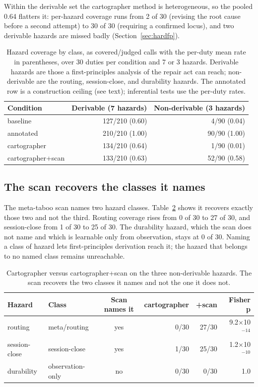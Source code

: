 \documentclass[11pt,a4paper]{article}
\begin{document}
Within the derivable set the cartographer method is heterogeneous, so the pooled
0.64 flatters it: per-hazard coverage runs from 2 of 30 (revising the root cause
before a second attempt) to 30 of 30 (requiring a confirmed locus), and two
derivable hazards are missed badly (Section~\ref{sec:hardfp}).

\begin{table}[h]
\centering
\small
\begin{tabular}{l r r}
\toprule
\textbf{Condition} & \textbf{Derivable (7 hazards)} & \textbf{Non-derivable (3 hazards)} \\
\midrule
baseline & 127/210 \enspace (0.60) & 4/90 \enspace (0.04) \\
annotated & 210/210 \enspace (1.00) & 90/90 \enspace (1.00) \\
cartographer & 134/210 \enspace (0.64) & 1/90 \enspace (0.01) \\
cartographer+scan & 133/210 \enspace (0.63) & 52/90 \enspace (0.58) \\
\bottomrule
\end{tabular}
\caption{Hazard coverage by class, as covered/judged calls with the per-duty mean
rate in parentheses, over 30 duties per condition and 7 or 3 hazards. Derivable
hazards are those a first-principles analysis of the repair act can reach;
non-derivable are the routing, session-close, and durability hazards. The
annotated row is a construction ceiling (see text); inferential tests use the
per-duty rates.}
\label{tab:coverage}
\end{table}

\subsection{The scan recovers the classes it names}

The meta-taboo scan names two hazard classes. Table~\ref{tab:scan} shows it
recovers exactly those two and not the third. Routing coverage rises from 0 of
30 to 27 of 30, and session-close from 1 of 30 to 25 of 30. The durability
hazard, which the scan does not name and which is learnable only from
observation, stays at 0 of 30. Naming a class of hazard lets first-principles
derivation reach it; the hazard that belongs to no named class remains
unreachable.

\begin{table}[h]
\centering
\small
\begin{tabular}{l l c r r r}
\toprule
\textbf{Hazard} & \textbf{Class} & \textbf{Scan names it} & \textbf{cartographer} & \textbf{+scan} & \textbf{Fisher p} \\
\midrule
routing & meta/routing & yes & 0/30 & 27/30 & 9.2$\times$10$^{-14}$ \\
session-close & session-close & yes & 1/30 & 25/30 & 1.2$\times$10$^{-10}$ \\
durability & observation-only & no & 0/30 & 0/30 & 1.0 \\
\bottomrule
\end{tabular}
\caption{Cartographer versus cartographer+scan on the three non-derivable
hazards. The scan recovers the two classes it names and not the one it does not.}
\label{tab:scan}
\end{table}
\end{document}

